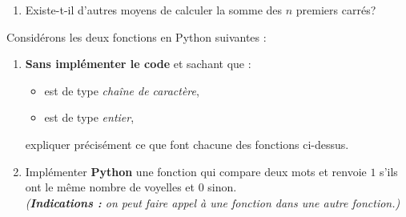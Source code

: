 \begin{boxexstheorieligne}
\begin{enumerate}[label=\alph*),itemsep=1mm]
\vspace{-5mm}
{\small(Une fonction  est une fonction qui fait appel à elle-même.)}
\item Existe-t-il d'autres moyens de calculer la somme des $n$ premiers carrés?
\end{enumerate}




\eexo
\pagebreak[3]



\exo
Considérons les deux fonctions en Python suivantes :

\vspace{3mm}
\begin{minipage}[t][][b]{0.5\textwidth}
\begin{center}
\end{center}
\end{minipage}\begin{minipage}[t][][b]{0.45\textwidth}
\begin{center}
\end{center}
\end{minipage}


\makeatletter
\begin{enumerate}[label=\alph*)]
\item \textbf{Sans implémenter le code} et sachant que :
\begin{itemize}
\item {} est de type \textit{chaîne de caractère},
\item {} est de type \textit{entier},
\end{itemize}
expliquer précisément ce que font chacune des fonctions ci-dessus.\par\nobreak\@nobreaktrue
\item Implémenter \textbf{Python} une fonction  qui compare deux mots et renvoie $1$ s'ils ont le même nombre de voyelles et 0 sinon.\\ \textit{\footnotesize(\textbf{Indications :} on peut faire appel à une fonction dans une autre fonction.)}
\end{enumerate}
\makeatother





\end{boxexstheorieligne}
